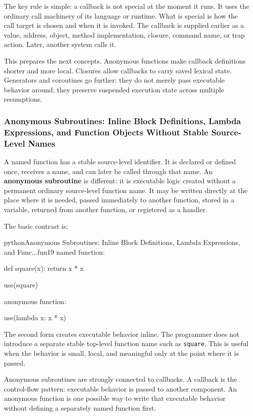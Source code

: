 \documentclass[a4paper,twoside]{report}
\begin{document}
The key rule is simple: a callback is not special at the moment it runs. It uses the ordinary call machinery of its language or runtime. What is special is how the call target is chosen and when it is invoked. The callback is supplied earlier as a value, address, object, method implementation, closure, command name, or trap action. Later, another system calls it.

This prepares the next concepts. Anonymous functions make callback definitions shorter and more local. Closures allow callbacks to carry saved lexical state. Generators and coroutines go further: they do not merely pass executable behavior around; they preserve suspended execution state across multiple resumptions.


\subsubsection{Anonymous Subroutines: Inline Block Definitions, Lambda Expressions, and Function Objects Without Stable Source-Level Names}

A named function has a stable source-level identifier. It is declared or defined once, receives a name, and can later be called through that name. An \textbf{anonymous subroutine} is different: it is executable logic created without a permanent ordinary source-level function name. It may be written directly at the place where it is needed, passed immediately to another function, stored in a variable, returned from another function, or registered as a handler.

The basic contrast is:

\begin{codebox}[]{python}{Anonymous Subroutines: Inline Block Definitions, Lambda Expressions, and Func...}{fun19}
named function:

def square(x):
    return x * x

use(square)


anonymous function:

use(lambda x: x * x)
\end{codebox}


The second form creates executable behavior inline. The programmer does not introduce a separate stable top-level function name such as \texttt{square}. This is useful when the behavior is small, local, and meaningful only at the point where it is passed.

Anonymous subroutines are strongly connected to callbacks. A callback is the control-flow pattern: executable behavior is passed to another component. An anonymous function is one possible way to write that executable behavior without defining a separately named function first.
\end{document}
